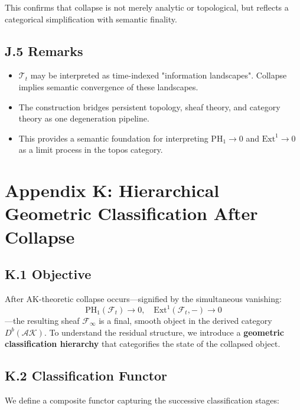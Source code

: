 \documentclass[11pt]{article}
\begin{document}
This confirms that collapse is not merely analytic or topological, but reflects a categorical simplification with semantic finality.

\subsection*{J.5 Remarks}

\begin{itemize}
  \item $\mathscr{T}_t$ may be interpreted as time-indexed "information landscapes". Collapse implies semantic convergence of these landscapes.
  \item The construction bridges persistent topology, sheaf theory, and category theory as one degeneration pipeline.
  \item This provides a semantic foundation for interpreting $\mathrm{PH}_1 \to 0$ and $\mathrm{Ext}^1 \to 0$ as a limit process in the topos category.
\end{itemize}



\section*{Appendix K: Hierarchical Geometric Classification After Collapse}

\subsection*{K.1 Objective}

After AK-theoretic collapse occurs—signified by the simultaneous vanishing:
\[
\mathrm{PH}_1(\mathcal{F}_t) \to 0, \quad \mathrm{Ext}^1(\mathcal{F}_t, -) \to 0
\]
—the resulting sheaf $\mathcal{F}_\infty$ is a final, smooth object in the derived category $D^b(\mathcal{AK})$.  
To understand the residual structure, we introduce a \textbf{geometric classification hierarchy} that categorifies the state of the collapsed object.

\subsection*{K.2 Classification Functor}

We define a composite functor capturing the successive classification stages:
\end{document}
